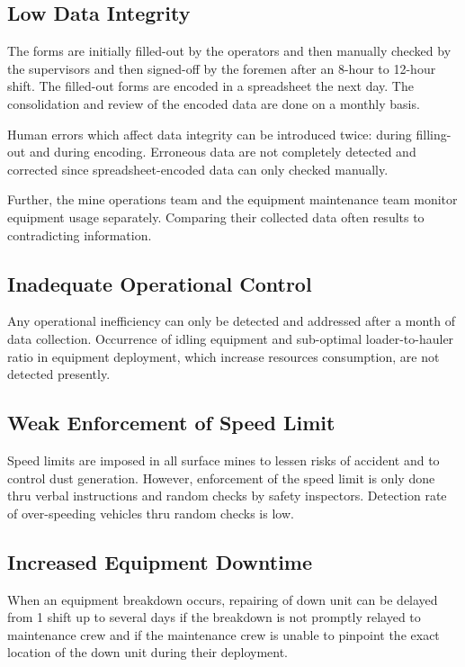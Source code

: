 \documentclass[12pt]{report}
\begin{document}
\subsection{Low Data Integrity}

The forms are initially filled-out by the operators and then manually checked by the supervisors and then signed-off by the foremen after an 8-hour to 12-hour shift.
The filled-out forms are encoded in a spreadsheet the next day.
The consolidation and review of the encoded data are done on a monthly basis.

Human errors which affect data integrity can be introduced twice: during filling-out and during encoding.
Erroneous data are not completely detected and corrected since spreadsheet-encoded data can only checked manually.

Further, the mine operations team and the equipment maintenance team monitor equipment usage separately.
Comparing their collected data often results to contradicting information.

\subsection{Inadequate Operational Control}

Any operational inefficiency can only be detected and addressed after a month of data collection.
Occurrence of idling equipment and sub-optimal loader-to-hauler ratio in equipment deployment, which increase resources consumption, are not detected presently.

\subsection{Weak Enforcement of Speed Limit}

Speed limits are imposed in all surface mines to lessen risks of accident and to control dust generation.
However, enforcement of the speed limit is only done thru verbal instructions and random checks by safety inspectors.
Detection rate of over-speeding vehicles thru random checks is low.

\subsection{Increased Equipment Downtime}

When an equipment breakdown occurs, repairing of down unit can be delayed from 1 shift up to several days if the breakdown is not promptly relayed to maintenance crew and if the maintenance crew is unable to pinpoint the exact location of the down unit during their deployment.
\end{document}
